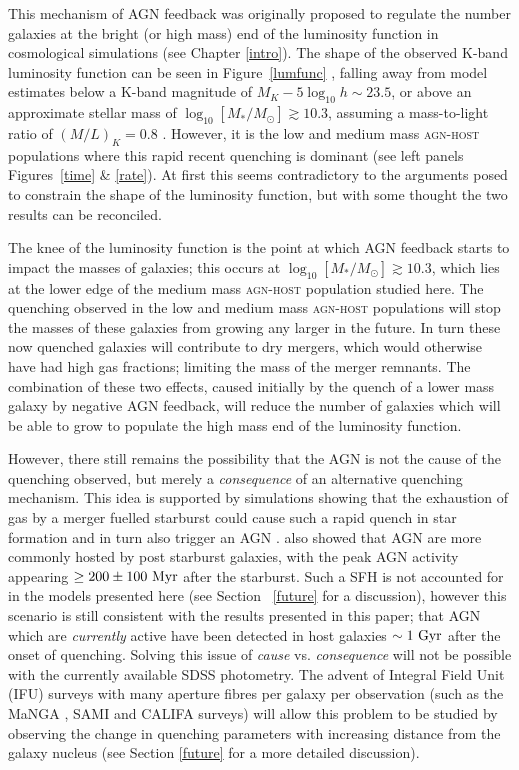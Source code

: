 This mechanism of AGN feedback was originally proposed to regulate the number galaxies at the bright (or high mass) end of the luminosity function in cosmological simulations (see Chapter \ref{intro}). The shape of the observed K-band luminosity function can be seen in Figure~\ref{lumfunc} \citep[Figure 1 from][]{benson03}, falling away from model estimates below a K-band magnitude of $M_K -5\log_{10} h \sim 23.5$, or above an approximate stellar mass of $\log_{10}[M_*/M_{\odot}] \gtrsim 10.3$, assuming a mass-to-light ratio of $(M/L)_K = 0.8$ \citep{brinchmann00}. However, it is the low and medium mass \textsc{agn-host} populations where this rapid recent quenching is dominant (see left panels Figures~\ref{time} \& \ref{rate}). At first this seems contradictory to the arguments posed to constrain the shape of the luminosity function, but with some thought the two results can be reconciled. 

The knee of the luminosity function is the point at which AGN feedback starts to impact the masses of galaxies; this occurs at $\log_{10}[M_*/M_{\odot}] \gtrsim 10.3$, which lies at the lower edge of the medium mass \textsc{agn-host} population studied here. The quenching observed in the low and medium mass \textsc{agn-host} populations will stop the masses of these galaxies from growing any larger in the future. In turn these now quenched galaxies will contribute to dry mergers, which would otherwise have had high gas fractions; limiting the mass of the merger remnants. The combination of these two effects, caused initially by the quench of a lower mass galaxy by negative AGN feedback, will reduce the number of galaxies which will be able to grow to populate the high mass end of the luminosity function. 

However, there still remains the possibility that the AGN is not the cause of the quenching observed, but merely a \emph{consequence} of an alternative quenching mechanism. This idea is supported by simulations showing that the exhaustion of gas by a merger fuelled starburst could cause such a rapid quench in star formation and in turn also trigger an AGN \citep{Croton06, Wild09, Snyder11, Hayward14}. \citet{Yesuf14} also showed that AGN are more commonly hosted by post starburst galaxies, with the peak AGN activity appearing $\geq 200 \pm 100 ~\rm{Myr}$ after the starburst. Such a SFH is not accounted for in the models presented here (see Section ~\ref{future} for a discussion), however this scenario is still consistent with the results presented in this paper; that AGN which are \emph{currently} active have been detected in host galaxies $\sim 1~\rm{Gyr}$ after the onset of quenching. Solving this issue of \emph{cause} vs. \emph{consequence} will not be possible with the currently available SDSS photometry. The advent of Integral Field Unit (IFU) surveys with many aperture fibres per galaxy per observation (such as the MaNGA \citep{bundy15}, SAMI \citep{croom12} and CALIFA \citep{sanchez12} surveys) will allow this problem to be studied by observing the change in quenching parameters with increasing distance from the galaxy nucleus (see Section \ref{future} for a more detailed discussion). 
 

